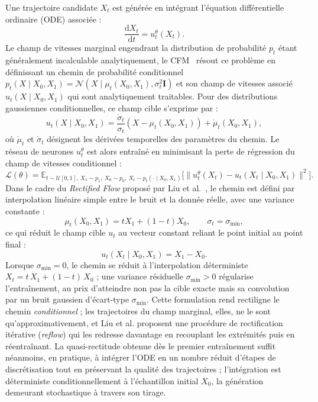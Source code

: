 Une trajectoire candidate $X_t$ est générée en intégrant l'équation différentielle ordinaire (\ac{ODE}) associée :
\begin{equation}
\frac{\mathrm{d}X_t}{\mathrm{d}t} = u_t^{\theta}(X_t).
\end{equation}
Le champ de vitesses marginal engendrant la distribution de probabilité $p_t$ étant généralement incalculable analytiquement, le \ac{CFM}~\cite{Tong2024Conditional} résout ce problème en définissant un chemin de probabilité conditionnel $p_t(X \mid X_0, X_1) = \mathcal{N}(X \mid \mu_t(X_0, X_1), \sigma_t^2 \mathbf{I})$ et son champ de vitesses associé $u_t(X \mid X_0, X_1)$ qui sont analytiquement traitables. Pour des distributions gaussiennes conditionnelles, ce champ cible s'exprime par :
\begin{equation}
u_t(X \mid X_0, X_1) = \frac{\dot{\sigma}_t}{\sigma_t} \left(X - \mu_t(X_0, X_1)\right) + \dot{\mu}_t(X_0, X_1),
\end{equation}
où $\dot{\mu}_t$ et $\dot{\sigma}_t$ désignent les dérivées temporelles des paramètres du chemin. Le réseau de neurones $u_t^{\theta}$ est alors entraîné en minimisant la perte de régression du champ de vitesses conditionnel :
\begin{equation}
\label{eq:cfm_loss}
\mathcal{L}(\theta) = \mathbb{E}_{t \sim \mathcal{U}[0, 1],\ X_1 \sim p_1,\ X_0 \sim p_0,\ X_t \sim p_t(\cdot \mid X_0, X_1)}\Big[\big\| u_t^{\theta}(X_t) - u_t(X_t \mid X_0, X_1)\big\|^2\Big].
\end{equation}
Dans le cadre du \textit{Rectified Flow} proposé par Liu et al.~\cite{Liu2023Rectified}, le chemin est défini par interpolation linéaire simple entre le bruit et la donnée réelle, avec une variance constante :
\begin{equation}
\mu_t(X_0, X_1) = t X_1 + (1-t) X_0, \qquad \sigma_t = \sigma_{\min},
\end{equation}
ce qui réduit le champ cible $u_t$ au vecteur constant reliant le point initial au point final :
\begin{equation}
u_t(X_t \mid X_0, X_1) = X_1 - X_0.
\end{equation}
Lorsque $\sigma_{\min}=0$, le chemin se réduit à l'interpolation déterministe $X_t = t\,X_1 + (1-t)\,X_0$ ; une variance résiduelle $\sigma_{\min}>0$ régularise l'entraînement, au prix d'atteindre non pas la cible exacte mais sa convolution par un bruit gaussien d'écart-type $\sigma_{\min}$. Cette formulation rend rectiligne le chemin \textit{conditionnel} ; les trajectoires du champ marginal, elles, ne le sont qu'approximativement, et Liu et al. proposent une procédure de rectification itérative (\textit{reflow}) qui les redresse davantage en recouplant les extrémités puis en réentraînant. La quasi-rectitude obtenue dès le premier entraînement suffit néanmoins, en pratique, à intégrer l'\ac{ODE} en un nombre réduit d'étapes de discrétisation tout en préservant la qualité des trajectoires ; l'intégration est déterministe conditionnellement à l'échantillon initial $X_0$, la génération demeurant stochastique à travers son tirage.


